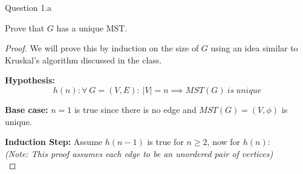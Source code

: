 \begin{solution}{Question 1.a}
    \begin{question}[]
        Prove that $G$ has a unique MST.\@
    \end{question}
    \tcblower{}
    \begin{proof}
        We will prove this by induction on the size of $G$ using an idea similar to Kruskal's algorithm discussed in the class.

        \textbf{Hypothesis:}
        \begin{equation}
            h(n): \forall\ G=(V,E):\ |V|=n\implies MST(G)\ is\ unique
        \end{equation}

        \textbf{Base case:} $n=1$ is true since there is no edge and $MST(G)=(V,\phi)$ is unique.

        \textbf{Induction Step:} Assume $h(n-1)$ is true for $n\geq 2$, now for $h(n)$:\\
        \textit{(Note: This proof assumes each edge to be an unordered pair of vertices)}\\


\end{proof}
\end{solution}
